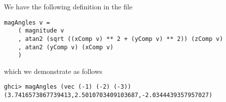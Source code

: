 
We have the following definition in the file 
\scriptsize\begin{verbatim}
magAngles v =
    ( magnitude v
    , atan2 (sqrt ((xComp v) ** 2 + (yComp v) ** 2)) (zComp v)
    , atan2 (yComp v) (xComp v)
    )
\end{verbatim}\normalsize
which we demonstrate as follows
\scriptsize\begin{verbatim}
ghci> magAngles (vec (-1) (-2) (-3))
(3.7416573867739413,2.5010703409103687,-2.0344439357957027)
\end{verbatim}\normalsize
